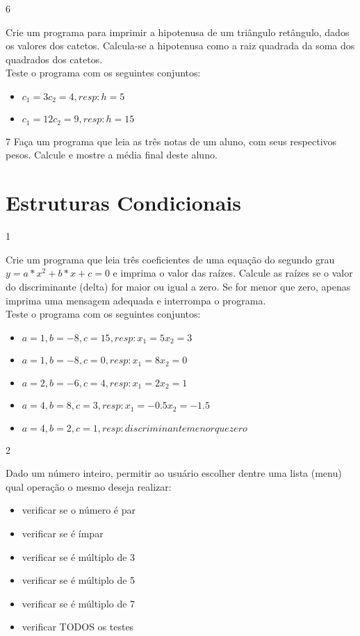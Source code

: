 \begin{exercicio}
  {6}
  {Crie um programa para imprimir a hipotenusa de um triângulo retângulo, dados os valores dos catetos. Calcula-se a hipotenusa como a raiz quadrada da soma dos quadrados dos catetos. \\
  Teste o programa com os seguintes conjuntos: \\
  \begin{itemize}
    \item $c_{1} = 3 c_{2} = 4, resp: h = 5$
    \item $c_{1} = 12c _{2} = 9, resp: h = 15$
  \end{itemize}}
\end{exercicio}

\begin{exercicio}
  {7}
  {Faça um programa que leia as três notas de um aluno, com seus respectivos pesos. Calcule e mostre a média final deste aluno.}
\end{exercicio}

\section{Estruturas Condicionais}
\begin{exercicio}
  {1}
  {Crie um programa que leia três coeficientes de uma equação do segundo grau $y=a*x^2 + b*x + c = 0$ e imprima o valor das raízes. Calcule as raízes se o valor do discriminante (delta) for maior ou igual a zero. Se for menor que zero, apenas imprima uma mensagem adequada e interrompa o programa. \\
  Teste o programa com os seguintes conjuntos: \\
  \begin{itemize}
    \item $a = 1, b = -8, c = 15, resp: x_{1} = 5 x_{2} = 3$
    \item $a = 1, b = -8, c = 0, resp: x_{1} = 8 x_{2} = 0$
    \item $a = 2, b = -6, c = 4, resp: x_{1} = 2 x_{2} = 1$
    \item $a = 4, b = 8, c = 3, resp: x_{1} = -0.5 x_{2} = -1.5$
    \item $a = 4, b = 2, c = 1, resp: discriminante menor que zero$
  \end{itemize}}
\end{exercicio}

\begin{exercicio}
  {2}
  {Dado um número inteiro, permitir ao usuário escolher dentre uma lista (menu) qual operação o mesmo deseja realizar: \\
  \begin{itemize}
    \item verificar se o número é par
    \item verificar se é ímpar
    \item verificar se é múltiplo de 3
    \item verificar se é múltiplo de 5
    \item verificar se é múltiplo de 7
    \item verificar TODOS os testes
  \end{itemize}}
\end{exercicio}

